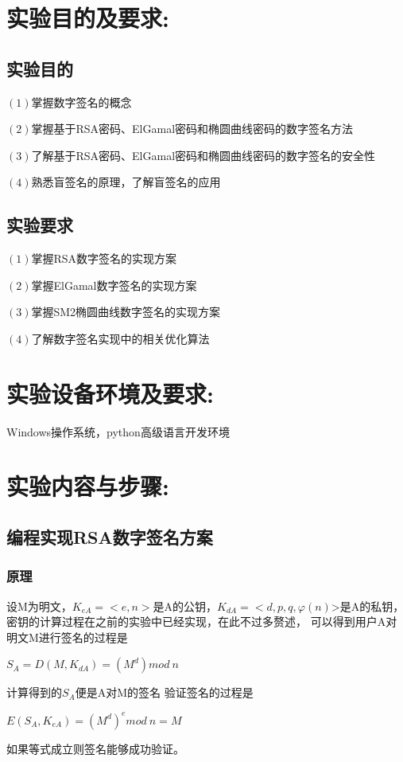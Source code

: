 \documentclass[a4paper,11pt,UTF8]{ctexart}
\begin{document}
\section{实验目的及要求:}
    \subsection{实验目的}
        $(1)$掌握数字签名的概念\par
        $(2)$掌握基于RSA密码、ElGamal密码和椭圆曲线密码的数字签名方法\par
        $(3)$了解基于RSA密码、ElGamal密码和椭圆曲线密码的数字签名的安全性\par
        $(4)$熟悉盲签名的原理，了解盲签名的应用\par

    \subsection{实验要求}
        $(1)$掌握RSA数字签名的实现方案\par
        $(2)$掌握ElGamal数字签名的实现方案\par
        $(3)$掌握SM2椭圆曲线数字签名的实现方案\par
        $(4)$了解数字签名实现中的相关优化算法\par

\section{实验设备环境及要求:}
    Windows操作系统，python高级语言开发环境

\section{实验内容与步骤:}
    \subsection{编程实现RSA数字签名方案}
        \subsubsection{原理}
            设M为明文，$K_{eA}=<e,n>$是A的公钥，$K_{dA}=<d,p,q,\varphi (n)$>是A的私钥，密钥的计算过程在之前的实验中已经实现，在此不过多赘述，
            可以得到用户A对明文M进行签名的过程是\par
            $S_{A}=D(M,K_{dA})=(M^{d}) mod\ n$\par
            计算得到的$S_{A}$便是A对M的签名
            验证签名的过程是\par
            $E(S_{A},K_{eA})=(M^{d})^{e} mod\ n=M$\par
            如果等式成立则签名能够成功验证。
\end{document}

